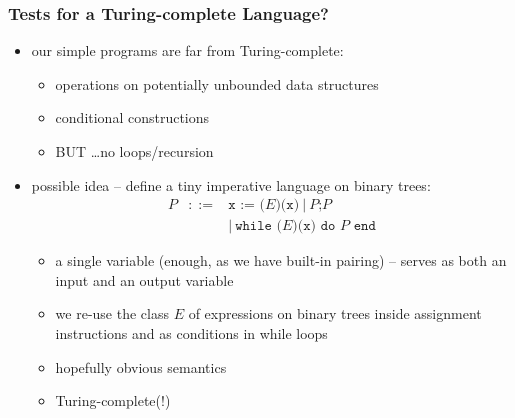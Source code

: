 \documentclass{beamer}
\begin{document}
\begin{frame}
  \frametitle{Tests for a Turing-complete Language?}
  \begin{itemize}
    \item our simple programs are far from Turing-complete:
    \begin{itemize}
      \item operations on potentially unbounded data structures
      \item conditional constructions
      \item BUT \ldots no loops/recursion
    \end{itemize}
    \item possible idea -- 
      define a tiny imperative language on binary trees:
      \[\begin{array}{lcl}
      P & ::= & \texttt{x := (} E \texttt{)(x)} ~|~ P \texttt{;} P \\
        &     & |~ \texttt{while (} E \texttt{)(x) do } P \texttt{ end}
      \end{array}
      \]
    \begin{itemize}
      \item a single variable (enough, as we have built-in pairing)
        -- serves as both an input and an output variable
      \item we re-use the class $E$ of expressions on binary trees inside
        assignment instructions and as conditions in while loops
      \item hopefully obvious semantics
      \item Turing-complete(!)
    \end{itemize}  
  \end{itemize}
\end{frame}
\end{document}
